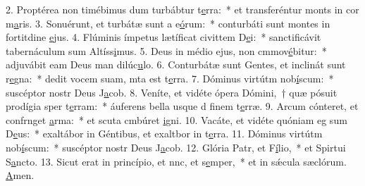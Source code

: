 2. Proptérea non timébimus dum turbábtur t\uline{e}rra:~* et transferéntur monts in cor m\uline{a}ris.
3. Sonuérunt, et turbátæ sunt a e\uline{ó}rum:~* conturbáti sunt montes in fortitdine \uline{e}jus.
4. Flúminis ímpetus lætíficat civittem D\uline{e}i:~* sanctificávit tabernáculum sum Altíss\uline{i}mus.
5. Deus in médio ejus, non cmmov\uline{é}bitur:~* adjuvábit eam Deus man dilúc\uline{u}lo.
6. Conturbátæ sunt Gentes, et inclinát sunt r\uline{e}gna:~* dedit vocem suam, mta est t\uline{e}rra.
7. Dóminus virtútm nob\uline{í}scum:~* suscéptor nostr Deus J\uline{a}cob.
8. Veníte, et vidéte ópera Dómini,~† quæ pósuit prodígia sper t\uline{e}rram:~* áuferens bella usque d finem t\uline{e}rræ.
9. Arcum cónteret, et confrnget \uline{a}rma:~* et scuta cmbúret \uline{i}gni.
10. Vacáte, et vidéte quóniam eg sum D\uline{e}us:~* exaltábor in Géntibus, et exaltbor in t\uline{e}rra.
11. Dóminus virtútm nob\uline{í}scum:~* suscéptor nostr Deus J\uline{a}cob.
12. Glória Patr, et F\uline{í}lio,~* et Spirtui S\uline{a}ncto.
13. Sicut erat in princípio, et nnc, et s\uline{e}mper,~* et in sǽcula sæclórum. \uline{A}men.
